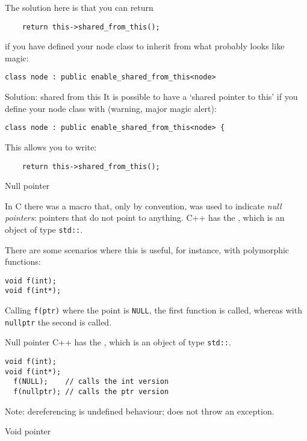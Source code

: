 The solution here is that you can return
\begin{lstlisting}
    return this->shared_from_this();
\end{lstlisting}
if you have defined your node class to inherit from what probably
looks like magic:
\begin{lstlisting}
class node : public enable_shared_from_this<node>
\end{lstlisting}

\begin{slide}{Solution: shared from this}
  \label{sl:share-ptr-node-from}
  It is possible to have a `shared pointer to this' if you
  define your node class with (warning, major magic alert):
\begin{lstlisting}
class node : public enable_shared_from_this<node> {
\end{lstlisting}
This allows you to write:
\begin{lstlisting}
    return this->shared_from_this();
\end{lstlisting}
\end{slide}

 {Null pointer}

In C there was a macro  that, only by convention, was
used to indicate
\emph{null pointers}:
pointers that do not point to anything.
C++ has the , which is an object of type
\lstinline{std::}.

There are some scenarios where this is useful, for instance, with
polymorphic functions:
\begin{lstlisting}
void f(int);
void f(int*);
\end{lstlisting}
Calling \lstinline{f(ptr)} where the point is \lstinline{NULL}, the first function is
called, whereas with \lstinline{nullptr} the second is called.

\begin{slide}{Null pointer}
  \label{sl:cpp-nullptr}
  C++ has the , which is an object of type
  \lstinline{std::}.

\begin{lstlisting}
void f(int);
void f(int*);
  f(NULL);    // calls the int version
  f(nullptr); // calls the ptr version
\end{lstlisting}
Note: dereferencing is undefined behaviour; does not throw an exception.
\end{slide}

 {Void pointer}

